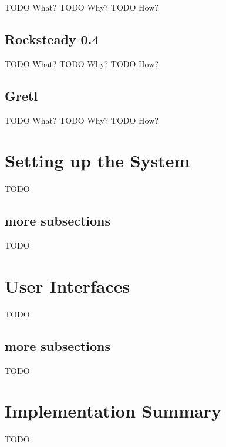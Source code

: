 TODO What?
TODO Why?
TODO How?

\subsection{Rocksteady 0.4}

TODO What?
TODO Why?
TODO How?

\subsection{Gretl}

TODO What?
TODO Why?
TODO How?

\section{Setting up the System}
TODO
\subsection{more subsections}
TODO
\section{User Interfaces}
TODO
\subsection{more subsections}
TODO
\section{Implementation Summary}
TODO